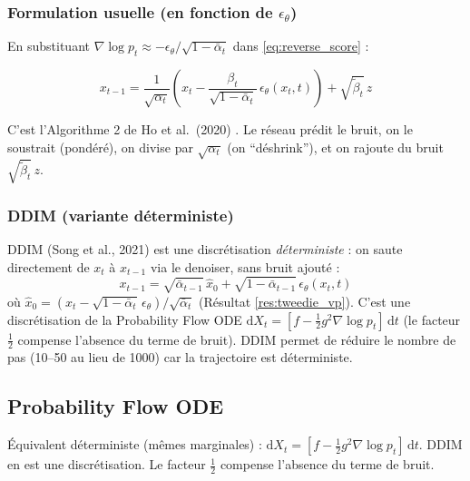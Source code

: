 \documentclass[12pt]{article}
\begin{document}
\subsubsection{Formulation usuelle (en fonction de $\epsilon_\theta$)}

En substituant $\nabla \log p_t \approx -\epsilon_\theta / \sqrt{1-\bar{\alpha}_t}$ dans \eqref{eq:reverse_score} :

\begin{equation}
    \boxed{x_{t-1} = \frac{1}{\sqrt{\alpha_t}}\!\left(x_t - \frac{\beta_t}{\sqrt{1-\bar{\alpha}_t}}\,\epsilon_\theta(x_t, t)\right) + \sqrt{\tilde{\beta}_t}\, z}
    \label{eq:ddpm_sample}
\end{equation}

C'est l'Algorithme 2 de Ho et al.\ (2020) \cite{ho2020denoising}. Le réseau prédit le bruit, on le soustrait (pondéré), on divise par $\sqrt{\alpha_t}$ (on ``déshrink''), et on rajoute du bruit $\sqrt{\tilde{\beta}_t}\, z$.

\subsubsection{DDIM (variante déterministe)}

DDIM (Song et al., 2021) \cite{song2021denoising} est une discrétisation \emph{déterministe} : on saute directement de $x_t$ à $x_{t-1}$ via le denoiser, sans bruit ajouté :
\[
x_{t-1} = \sqrt{\bar{\alpha}_{t-1}}\, \hat{x}_0 + \sqrt{1-\bar{\alpha}_{t-1}}\, \epsilon_\theta(x_t, t)
\]
où $\hat{x}_0 = (x_t - \sqrt{1-\bar{\alpha}_t}\,\epsilon_\theta) / \sqrt{\bar{\alpha}_t}$ (Résultat \ref{res:tweedie_vp}). C'est une discrétisation de la Probability Flow ODE $\mathrm{d}X_t = [f - \frac{1}{2}g^2 \nabla \log p_t]\,\mathrm{d}t$ (le facteur $\frac{1}{2}$ compense l'absence du terme de bruit). DDIM permet de réduire le nombre de pas (10--50 au lieu de 1000) car la trajectoire est déterministe.

\subsection{Probability Flow ODE}

Équivalent déterministe (mêmes marginales) : $\mathrm{d}X_t = [f - \frac{1}{2}g^2 \nabla \log p_t]\,\mathrm{d}t$. DDIM en est une discrétisation. Le facteur $\frac{1}{2}$ compense l'absence du terme de bruit.
\end{document}

